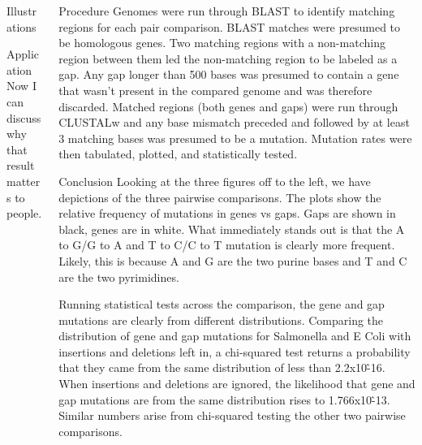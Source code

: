 \documentclass[final]{beamer}
\begin{document}
\begin{frame}{}
\begin{columns}[t]
\begin{column}{.32 \linewidth}
\begin{block}{\large Illustrations}
\end{block}


\begin{block}{\large Application}
  Now I can discuss why that result matters to people.
\end{block}

\end{column}




\begin{column}{.32 \linewidth}

\begin{block}{Procedure}
Genomes were run through BLAST to identify matching regions for each pair comparison. BLAST matches were presumed to be homologous genes. Two matching regions with a non-matching region between them led the non-matching region to be labeled as a gap. Any gap longer than 500 bases was presumed to contain a gene that wasn't present in the compared genome and was therefore discarded.
\newline
Matched regions (both genes and gaps) were run through CLUSTALw and any base mismatch preceded and followed by at least 3 matching bases was presumed to be a mutation. Mutation rates were then tabulated, plotted, and statistically tested.
\end{block}
\begin{block}{\large Conclusion}
Looking at the three figures off to the left, we have depictions of the three pairwise comparisons. The plots show the relative frequency of mutations in genes vs gaps. Gaps are shown in black, genes are in white. What immediately stands out is that the A to G/G to A and T to C/C to T mutation is clearly more frequent. Likely, this is because A and G are the two purine bases and T and C are the two pyrimidines.

Running statistical tests across the comparison, the gene and gap mutations are clearly from different distributions. Comparing the distribution of gene and gap mutations for Salmonella and E Coli with insertions and deletions left in, a chi-squared test returns a probability that they came from the same distribution of less than 2.2x10\^-16. When insertions and deletions are ignored, the likelihood that gene and gap mutations are from the same distribution rises to 1.766x10\^-13. Similar numbers arise from chi-squared testing the other two pairwise comparisons. 


\end{block}
\end{column}
\end{columns}
\end{frame}
\end{document}
